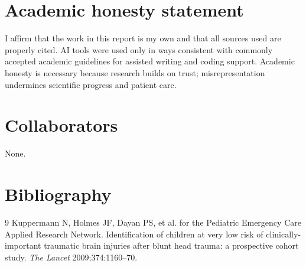 \documentclass[11pt,letterpaper]{article}
\begin{document}
\section{Academic honesty statement}\label{academic-honesty-statement}

I affirm that the work in this report is my own and that all sources used are properly cited. AI tools were used only in ways consistent with commonly accepted academic guidelines for assisted writing and coding support. Academic honesty is necessary because research builds on trust; misrepresentation undermines scientific progress and patient care.

\section{Collaborators}\label{collaborators}

None.

\section{Bibliography}\label{bibliography}

\begin{thebibliography}{9}
Kuppermann N, Holmes JF, Dayan PS, et al. for the Pediatric Emergency Care Applied Research Network.
Identification of children at very low risk of clinically-important traumatic brain injuries after blunt head trauma: a prospective cohort study.
\textit{The Lancet} 2009;374:1160--70.
\end{thebibliography}
\end{document}
